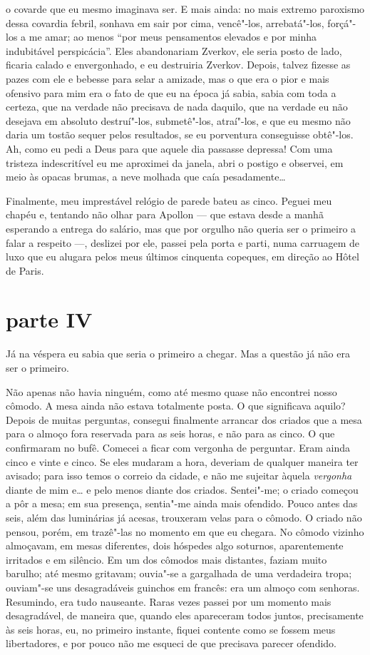 o covarde que eu mesmo imaginava ser. E mais ainda: no mais extremo
paroxismo dessa covardia febril, sonhava em sair por cima, vencê"-los,
arrebatá"-los, forçá"-los a me amar; ao menos ``por meus pensamentos
elevados e por minha indubitável perspicácia''. Eles abandonariam
Zverkov, ele seria posto de lado, ficaria calado e envergonhado, e eu
destruiria Zverkov. Depois, talvez fizesse as pazes com ele e bebesse
para selar a amizade, mas o que era o pior e mais ofensivo para mim era
o fato de que eu na época já sabia, sabia com toda a certeza, que na
verdade não precisava de nada daquilo, que na verdade eu não desejava
em absoluto destruí"-los, submetê"-los, atraí"-los, e que eu mesmo não
daria um tostão sequer pelos resultados, se eu porventura conseguisse
obtê"-los. Ah, como eu pedi a Deus para que aquele dia passasse
depressa! Com uma tristeza indescritível eu me aproximei da janela,
abri o postigo e observei, em meio às opacas brumas, a neve molhada que
caía pesadamente\ldots{}

Finalmente, meu imprestável relógio de parede bateu as cinco. Peguei meu
chapéu e, tentando não olhar para Apollon --- que estava desde a manhã
esperando a entrega do salário, mas que por orgulho não queria ser o
primeiro a falar a respeito ---, deslizei por ele, passei pela porta e
parti, numa carruagem de luxo que eu alugara pelos meus últimos
cinquenta copeques, em direção ao Hôtel de \mbox{Paris}.


\section{parte IV}

Já na véspera eu sabia que seria o primeiro a chegar. Mas a questão já
não era ser o primeiro.

Não apenas não havia ninguém, como até mesmo quase não encontrei nosso
cômodo. A mesa ainda não estava totalmente posta. O que significava
aquilo? Depois de muitas perguntas, consegui finalmente arrancar dos
criados que a mesa para o almoço fora reservada para as seis horas, e
não para as cinco. O que confirmaram no bufê. Comecei a ficar com
vergonha de perguntar. Eram ainda cinco e vinte e cinco. Se eles
mudaram a hora, deveriam de qualquer maneira ter avisado; para isso
temos o correio da cidade, e não me sujeitar àquela \textit{vergonha} diante
de mim e\ldots{} e pelo menos diante dos criados. Sentei"-me; o criado começou
a pôr a mesa; em sua presença, sentia"-me ainda mais ofendido. Pouco
antes das seis, além das luminárias já acesas, trouxeram velas para o
cômodo. O criado não pensou, porém, em trazê"-las no momento em que eu
chegara. No cômodo vizinho almoçavam, em mesas diferentes, dois
hóspedes algo soturnos, aparentemente irritados e em silêncio. Em um
dos cômodos mais distantes, faziam muito barulho; até mesmo gritavam;
ouvia"-se a gargalhada de uma verdadeira tropa; ouviam"-se uns
desagradáveis guinchos em francês: era um almoço com senhoras.
Resumindo, era tudo nauseante. Raras vezes passei por um momento mais
desagradável, de maneira que, quando eles apareceram todos juntos,
precisamente às seis horas, eu, no primeiro instante, fiquei contente
como se fossem meus libertadores, e por pouco não me esqueci de que
precisava parecer ofendido.

